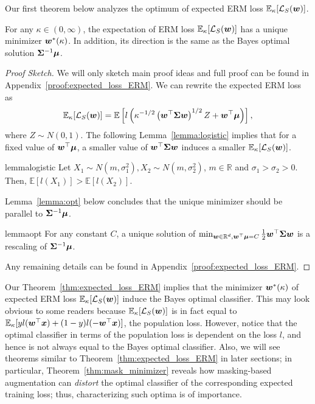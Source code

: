 Our first theorem below analyzes the optimum of expected ERM loss $\mathbb{E}_\kappa[\mathcal{L}_S({\bm{w}})]$.
\begin{theorem}\label{thm:expected_loss_ERM}
For any $\kappa \in (0,\infty)$, the expectation of ERM loss $\mathbb{E}_\kappa[\mathcal{L}_S({\bm{w}})]$ has a unique minimizer ${\bm{w}}^*(\kappa)$. In addition, its direction is the same as the Bayes optimal solution ${\bm{\Sigma}}^{-1} {\bm{\mu}}$.
\end{theorem}
\vspace*{-10pt}
\begin{proof}[Proof Sketch]
We will only sketch main proof ideas and full proof can be found in Appendix~\ref{proof:expected_loss_ERM}. We can rewrite the expected ERM loss as
\begin{equation*}
\mathbb{E}_\kappa [\mathcal{L}_S ({\bm{w}})] = \mathbb{E}\left[ l\left( \kappa^{-1/2} \left({\bm{w}}^\top {\bm{\Sigma}} {\bm{w}}\right)^{1/2} Z + {\bm{w}}^\top {\bm{\mu}} \right)\right],
\end{equation*}
where $Z \sim N(0,1)$.
The following Lemma~\ref{lemma:logistic} implies that for a fixed value of ${\bm{w}}^\top{\bm{\mu}}$, a smaller value of ${\bm{w}}^\top {\bm{\Sigma}} {\bm{w}}$ induces a smaller $\mathbb{E}_\kappa[\mathcal{L}_S({\bm{w}})]$.
\begin{restatable}{lemma}{logistic}\label{lemma:logistic}
Let $X_1 \sim N(m, \sigma_1^2), X_2 \sim N(m, \sigma_2^2)$, $m \in \mathbb{R}$ and $\sigma_1 > \sigma_2>0$. Then, $\mathbb{E}[l(X_1)] > \mathbb{E}[l(X_2)]$.
\end{restatable}
\vspace*{-10pt}
Lemma~\ref{lemma:opt} below concludes that the unique minimizer should be parallel to ${\bm{\Sigma}}^{-1} {\bm{\mu}}$.
\begin{restatable}{lemma}{opt}\label{lemma:opt}
For any constant $C$, a unique solution of $\min_{{\bm{w}} \in \mathbb{R}^d, {\bm{w}}^\top {\bm{\mu}} = C} \frac{1}{2} {\bm{w}}^\top {\bm{\Sigma}} {\bm{w}}$ is a rescaling of ${\bm{\Sigma}}^{-1} {\bm{\mu}}$.
\end{restatable}
\vspace*{-10pt}
Any remaining details can be found in Appendix~\ref{proof:expected_loss_ERM}.
\end{proof}
\vspace*{-10pt}
Our Theorem~\ref{thm:expected_loss_ERM} implies that the minimizer ${\bm{w}}^*(\kappa)$ of expected ERM loss $\mathbb{E}_\kappa [\mathcal{L}_S ({\bm{w}})]$ induce the Bayes optimal classifier. 
This may look obvious to some readers because $\mathbb{E}_\kappa [\mathcal{L}_S ({\bm{w}})]$ is in fact equal to $\mathbb{E}_\kappa[y l({\bm{w}}^\top {\bm{x}}) + (1-y) l(-{\bm{w}}^\top {\bm{x}})]$, the population loss. However, notice that the optimal classifier in terms of the population loss is dependent on the loss $l$, and hence is not always equal to the Bayes optimal classifier.
Also, we will see theorems similar to Theorem~\ref{thm:expected_loss_ERM} in later sections; in particular, Theorem~\ref{thm:mask_minimizer} reveals how masking-based augmentation can \emph{distort} the optimal classifier of the corresponding expected training loss; thus, characterizing such optima is of importance.

